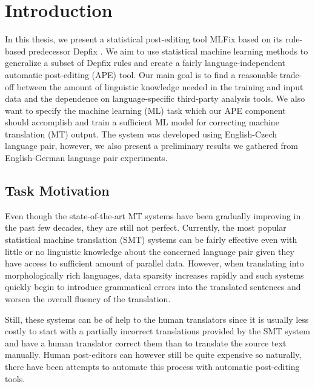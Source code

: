 \chapter{Introduction}

In this thesis, we present a statistical post-editing tool MLFix
based on its rule-based predecessor Depfix \citep{depfix:2014}.
We aim to use statistical machine learning methods to generalize a subset of Depfix rules
and create a fairly language-independent automatic post-editing (APE) tool.
Our main goal is to find a reasonable trade-off between the amount
of linguistic knowledge needed in the training and input data
and the dependence
on language-specific third-party analysis tools.
We also want to specify the
machine learning (ML) task which our APE component should accomplish and train
a sufficient ML model for correcting machine translation (MT) output.
The system was developed using English-Czech language pair, however, we also present
a preliminary results we gathered from English-German language pair experiments.

\section{Task Motivation}

Even though the state-of-the-art MT systems have been gradually improving in the
past few decades, they are still not perfect. Currently, the most popular statistical machine
translation (SMT) systems can be fairly effective even 
with little or no
linguistic knowledge about the concerned language pair given they have access to sufficient
amount of parallel data. However, when translating into morphologically rich languages,
data sparsity increases rapidly and such systems quickly begin to introduce grammatical
errors into the translated sentences and worsen the overall fluency of the translation.

Still, these systems can be of help to the human translators since it is usually less costly
to start with a partially incorrect translations provided by the SMT system and have
a human translator correct them than to translate the source text manually.
Human post-editors can however still be quite expensive so naturally, there have been
attempts to automate this process with automatic post-editing tools.

